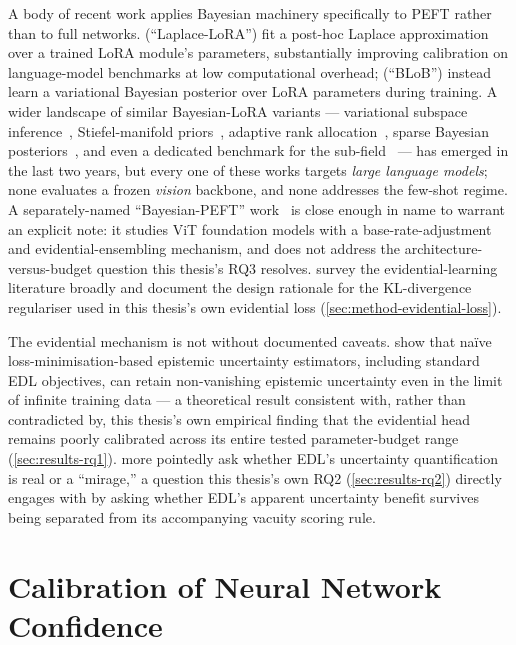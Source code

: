 \documentclass{iutbscthesis}
\begin{document}
A body of recent work applies Bayesian machinery specifically to PEFT rather than to full networks. \textcite{yang2024laplacelora} (``Laplace-LoRA'') fit a post-hoc Laplace approximation over a trained LoRA module's parameters, substantially improving calibration on language-model benchmarks at low computational overhead; \textcite{wang2024blob} (``BLoB'') instead learn a variational Bayesian posterior over LoRA parameters during training. A wider landscape of similar Bayesian-LoRA variants — variational subspace inference~\cite{samplawski2025scalabl}, Stiefel-manifold priors~\cite{shihab2026stiefelbayes}, adaptive rank allocation~\cite{duan2026bara}, sparse Bayesian posteriors~\cite{zhang2026bayesiansparselora}, and even a dedicated benchmark for the sub-field~\cite{samplawski2026bagym} — has emerged in the last two years, but every one of these works targets \emph{large language models}; none evaluates a frozen \emph{vision} backbone, and none addresses the few-shot regime. A separately-named ``Bayesian-PEFT'' work~\cite{pandey2024bayesianpeft} is close enough in name to warrant an explicit note: it studies ViT foundation models with a base-rate-adjustment and evidential-ensembling mechanism, and does not address the architecture-versus-budget question this thesis's RQ3 resolves. \textcite{gao2024edlsurvey} survey the evidential-learning literature broadly and document the design rationale for the KL-divergence regulariser used in this thesis's own evidential loss (\autoref{sec:method-evidential-loss}).

The evidential mechanism is not without documented caveats. \textcite{bengs2022pitfalls} show that na\"ive loss-minimisation-based epistemic uncertainty estimators, including standard EDL objectives, can retain non-vanishing epistemic uncertainty even in the limit of infinite training data — a theoretical result consistent with, rather than contradicted by, this thesis's own empirical finding that the evidential head remains poorly calibrated across its entire tested parameter-budget range (\autoref{sec:results-rq1}). \textcite{shen2024mirage} more pointedly ask whether EDL's uncertainty quantification is real or a ``mirage,'' a question this thesis's own RQ2 (\autoref{sec:results-rq2}) directly engages with by asking whether EDL's apparent uncertainty benefit survives being separated from its accompanying vacuity scoring rule.

\section{Calibration of Neural Network Confidence}
\label{sec:related-calibration}
\end{document}
